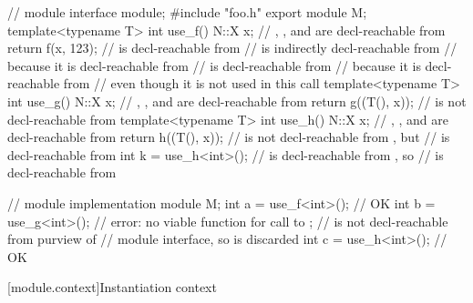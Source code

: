\begin{std.txt}
\begin{example}
\begin{codeblock}
// module  interface
module;
#include "foo.h"
export module M;
template<typename T> int use_f() {
  N::X x;                    // , , and \tcode{::} are decl-reachable from 
  return f(x, 123);          //  is decl-reachable from 
                             //  is indirectly decl-reachable from 
                             //   because it is decl-reachable from 
                             //  is decl-reachable from 
                             //   because it is decl-reachable from 
                             //   even though it is not used in this call
}
template<typename T> int use_g() {
  N::X x;                    // , , and \tcode{::} are decl-reachable from 
  return g((T(), x));        //  is not decl-reachable from 
}
template<typename T> int use_h() {
  N::X x;                    // , , and \tcode{::} are decl-reachable from 
  return h((T(), x));        //  is not decl-reachable from , but
                             //  is decl-reachable from 
}
int k = use_h<int>();
  //  is decl-reachable from , so
  //  is decl-reachable from 

// module  implementation
module M;
int a = use_f<int>(); // OK
int b = use_g<int>(); // error: no viable function for call to ;
                      //  is not decl-reachable from purview of
                      // module  interface, so is discarded
int c = use_h<int>(); // OK
\end{codeblock}
\end{example}
\end{std.txt}

[module.context]{Instantiation context}

